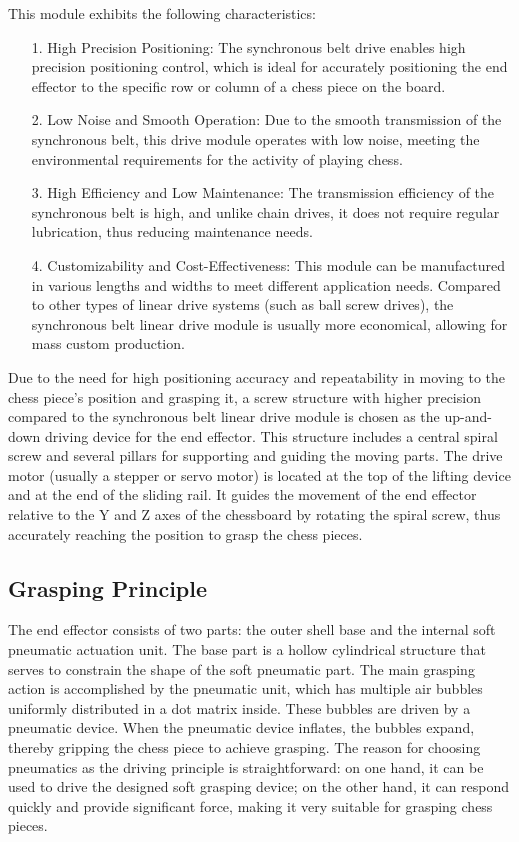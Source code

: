 \documentclass[10pt, a4paper, twocolumn]{article}
\begin{document}
This module exhibits the following characteristics:

\begin{itemize}
    \item [1.] High Precision Positioning: The synchronous belt drive enables high precision positioning control, which is ideal for accurately positioning the end effector to the specific row or column of a chess piece on the board.
    \item [2.] Low Noise and Smooth Operation: Due to the smooth transmission of the synchronous belt, this drive module operates with low noise, meeting the environmental requirements for the activity of playing chess.
    \item [3.] High Efficiency and Low Maintenance: The transmission efficiency of the synchronous belt is high, and unlike chain drives, it does not require regular lubrication, thus reducing maintenance needs.
    \item [4.] Customizability and Cost-Effectiveness: This module can be manufactured in various lengths and widths to meet different application needs. Compared to other types of linear drive systems (such as ball screw drives), the synchronous belt linear drive module is usually more economical, allowing for mass custom production.
\end{itemize}

Due to the need for high positioning accuracy and repeatability in moving to the chess piece's position and grasping it, a screw structure with higher precision compared to the synchronous belt linear drive module is chosen as the up-and-down driving device for the end effector. This structure includes a central spiral screw and several pillars for supporting and guiding the moving parts. The drive motor (usually a stepper or servo motor) is located at the top of the lifting device and at the end of the sliding rail. It guides the movement of the end effector relative to the Y and Z axes of the chessboard by rotating the spiral screw, thus accurately reaching the position to grasp the chess pieces.

\subsection{Grasping Principle}
The end effector consists of two parts: the outer shell base and the internal soft pneumatic actuation unit. The base part is a hollow cylindrical structure that serves to constrain the shape of the soft pneumatic part. The main grasping action is accomplished by the pneumatic unit, which has multiple air bubbles uniformly distributed in a dot matrix inside. These bubbles are driven by a pneumatic device. When the pneumatic device inflates, the bubbles expand, thereby gripping the chess piece to achieve grasping. The reason for choosing pneumatics as the driving principle is straightforward: on one hand, it can be used to drive the designed soft grasping device; on the other hand, it can respond quickly and provide significant force, making it very suitable for grasping chess pieces.
\end{document}
